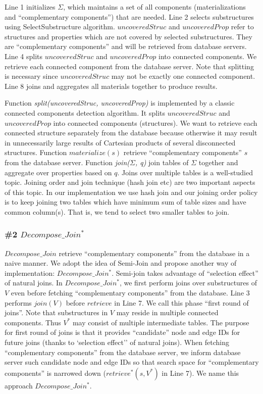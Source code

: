 Line 1 initializes $\Sigma$, which maintains a set of all components (materializations and ``complementary  components'') that are needed. Line 2 selects substructures using SelectSubstructure algorithm. $uncoveredStruc$ and $uncoveredProp$ refer to structures and properties which are not covered by selected substructures. They are ``complementary components'' and will be retrieved from database servers. Line 4 splits $uncoveredStruc$ and $uncoveredProp$ into connected components. We retrieve each connected component from the database server. Note that splitting is necessary since $uncoveredStruc$ may not be exactly one connected component. Line 8 joins and aggregates all materials together to produce results.

Function \textit{split(uncoveredStruc, uncoveredProp)} is implemented by a classic connected components detection algorithm. It splits $uncoveredStruc$ and $uncoveredProp$ into connected components (structures). We want to retrieve each connected structure separately from the database because otherwise it may result in unnecessarily large results of Cartesian products of several disconnected structures. Function \textit{$materialize(s)$} retrieve ``complementary components'' $s$ from the database server. Function \textit{join($\Sigma$, q)} join tables of $\Sigma$ together and aggregate over properties based on $q$. Joins over multiple tables is a well-studied topic. Joining order and join technique (hash join etc) are two important aspects of this topic. In our implementation we use hash join and our joining order policy is to keep joining two tables which have minimum sum of table sizes and have common column(s). That is, we tend to select two smaller tables to join.

\subsubsection{\#2 $Decompose\_Join^{*}$}
$Decompose\_Join$ retrieve ``complementary components'' from the database in a naive manner. We adopt the idea of Semi-Join \cite{DBLP:journals/dr/Ozsoyoglu99} and propose another way of implementation: $Decompose\_Join^{*}$. Semi-join takes advantage of ``selection effect'' of natural joins. In $Decompose\_Join^{*}$, we first perform joins over substructures of $V$ even before fetching ``complementary components'' from the database. Line 3 performs $join(V)$ before $retrieve$ in Line 7. We call this phase ``first round of joins''.  Note that substructures in $V$ may reside in multiple connected components. Thus $V^{*}$ may consist of multiple intermediate tables. The purpose for first round of joins is that it provides ``candidate'' node and edge IDs for future joins (thanks to `selection effect'' of natural joins). When fetching ``complementary components'' from the database server, we inform database server such candidate node and edge IDs so that search space for ``complementary components'' is narrowed down ($retrieve^{*}(s, V^{*})$ in Line 7). We name this approach $Decompose\_Join^{*}$.

